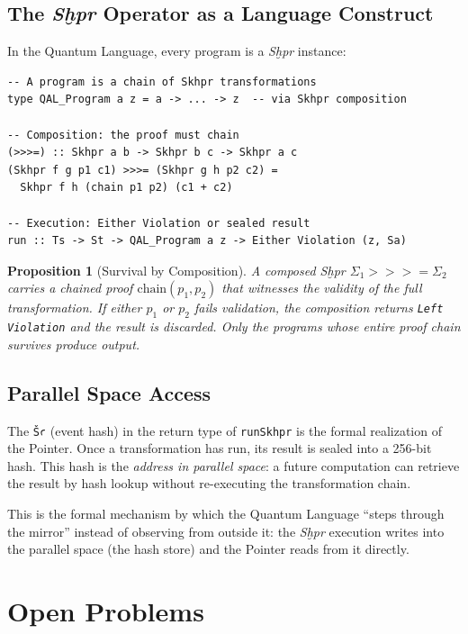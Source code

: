 \documentclass[11pt,letterpaper]{article}
\newtheorem{proposition}[theorem]{Proposition}
\begin{document}
\subsection{The \textit{Sḫpr} Operator as a Language Construct}

In the Quantum Language, every program is a \textit{Sḫpr} instance:

\begin{lstlisting}
-- A program is a chain of Skhpr transformations
type QAL_Program a z = a -> ... -> z  -- via Skhpr composition

-- Composition: the proof must chain
(>>>=) :: Skhpr a b -> Skhpr b c -> Skhpr a c
(Skhpr f g p1 c1) >>>= (Skhpr g h p2 c2) =
  Skhpr f h (chain p1 p2) (c1 + c2)

-- Execution: Either Violation or sealed result
run :: Ts -> St -> QAL_Program a z -> Either Violation (z, Sa)
\end{lstlisting}

\begin{proposition}[Survival by Composition]
A composed \textit{Sḫpr} $\Sigma_1 \mathbin{>>>=} \Sigma_2$ carries a chained
proof $\mathrm{chain}(p_1, p_2)$ that witnesses the validity of the full
transformation.  If either $p_1$ or $p_2$ fails validation, the composition
returns \texttt{Left Violation} and the result is discarded.  Only the
programs whose entire proof chain survives produce output.
\end{proposition}

\subsection{Parallel Space Access}

The \texttt{Šꜥ} (event hash) in the return type of \texttt{runSkhpr} is
the formal realization of the Pointer.  Once a transformation has run,
its result is sealed into a 256-bit hash.  This hash is the
\emph{address in parallel space}: a future computation can retrieve the
result by hash lookup without re-executing the transformation chain.

This is the formal mechanism by which the Quantum Language ``steps through
the mirror'' instead of observing from outside it: the \textit{Sḫpr}
execution writes into the parallel space (the hash store) and the Pointer
reads from it directly.

\section{Open Problems}
\label{sec:open}
\end{document}
